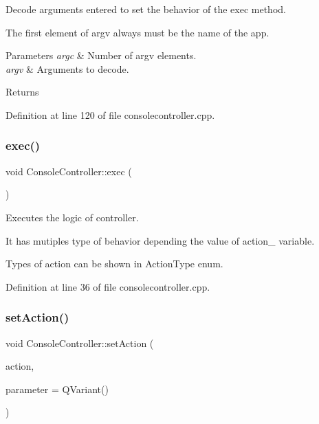 Decode arguments entered to set the behavior of the exec method. 

The first element of argv always must be the name of the app. 
\begin{DoxyParams}{Parameters}
{\em argc} & Number of argv elements. \\
\hline
{\em argv} & Arguments to decode. \\
\hline
\end{DoxyParams}
\begin{DoxyReturn}{Returns}

\end{DoxyReturn}


Definition at line 120 of file consolecontroller.\+cpp.

\mbox{\label{classConsoleController_accdfd546eef82cfe4d0942426a3b6fac}} 
\subsubsection{\texorpdfstring{exec()}{exec()}}
{\footnotesize\ttfamily void Console\+Controller\+::exec (\begin{DoxyParamCaption}{ }\end{DoxyParamCaption})}



Executes the logic of controller. 

It has mutiples type of behavior depending the value of action\+\_\+ variable.

Types of action can be shown in Action\+Type enum. 

Definition at line 36 of file consolecontroller.\+cpp.

\mbox{\label{classConsoleController_a13eaf91bd8d72afeaa3792255983e019}} 
\subsubsection{\texorpdfstring{set\+Action()}{setAction()}}
{\footnotesize\ttfamily void Console\+Controller\+::set\+Action (\begin{DoxyParamCaption}\item[{\mbox{\hyperlink{classConsoleController_a6bc36e6ee00aa2da0fd9be549b4251d9}{Action\+Type}}}]{action,  }\item[{Q\+Variant}]{parameter = {\ttfamily QVariant()} }\end{DoxyParamCaption})\hspace{0.3cm}{\ttfamily [inline]}}



